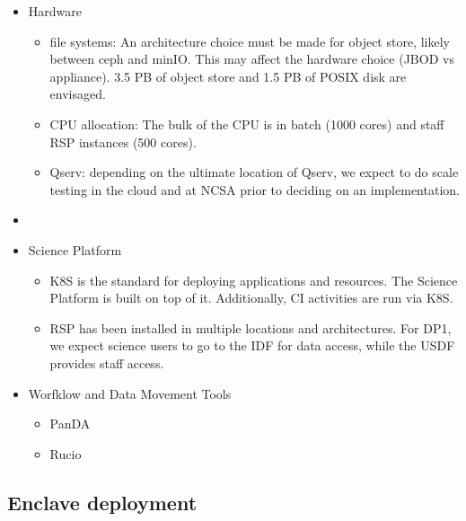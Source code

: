 \begin{itemize}
  \item Hardware
  \begin{itemize}
    \item file systems: An architecture choice must be made for object
      store, likely between ceph and minIO. This may affect the
      hardware choice (JBOD vs appliance). 3.5 PB of object store and
      1.5 PB of POSIX disk are envisaged.
    \item CPU allocation: The bulk of the CPU is in batch (1000 cores)
      and staff RSP instances (500 cores).
      \item Qserv: depending on the ultimate location of Qserv, we
        expect to do scale testing in the cloud and at NCSA prior to
        deciding on an implementation. 
  \end{itemize}

\item
  \item Science Platform
  \begin{itemize}
      \item \gls{K8S} is the standard for deploying applications and
        resources. The Science Platform is built on top of
        it. Additionally, \gls{CI} activities are run via K8S.
      \item \gls{RSP} has been installed in multiple locations and
        architectures. For DP1, we expect science users to go to the
        IDF for data access, while the USDF provides staff access.
  \end{itemize}

\item Worfklow and Data Movement Tools
\begin{itemize}
      \item PanDA
      \item Rucio
  \end{itemize}

\end{itemize}

\subsection {Enclave deployment}
